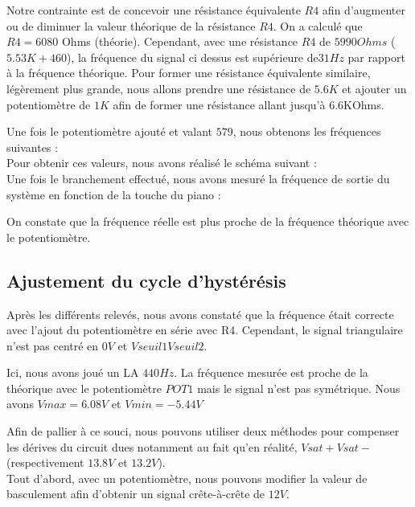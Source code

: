 Notre contrainte est de concevoir une résistance équivalente $R4$ afin d’augmenter ou de diminuer la valeur théorique de la résistance $R4$. 
On a calculé que $R4=6080$ Ohms (théorie).
Cependant, avec une résistance $R4$ de $5990 Ohms$ ($5.53K+460$), la fréquence du signal ci dessus est supérieure de$ 31 Hz$ par rapport à la fréquence théorique.
Pour former une résistance équivalente similaire, légèrement plus grande, nous allons prendre une résistance de $5.6K$ et ajouter un potentiomètre de $1K$ afin de former une résistance allant jusqu’à 6.6KOhms.

Une fois le potentiomètre ajouté et valant $579$, nous obtenons les fréquences suivantes :\\

Pour obtenir ces valeurs, nous avons réalisé le schéma suivant :\\

Une fois le branchement effectué, nous avons mesuré la fréquence de sortie du système en fonction de la touche du piano :

On constate que la fréquence réelle est plus proche de la fréquence théorique avec le potentiomètre.













\subsection{Ajustement du cycle d’hystérésis}
Après les différents relevés, nous avons constaté que la fréquence était correcte avec l’ajout du potentiomètre en série avec R4. 
Cependant, le signal triangulaire n’est pas centré en $0V$ 
et $Vseuil1Vseuil2$.


Ici, nous avons joué un LA $440 Hz$. La fréquence mesurée est proche de la théorique avec le potentiomètre $POT1$ mais le signal n’est pas symétrique. 
Nous avons $Vmax=6.08V$ et $Vmin=-5.44V$





Afin de pallier à ce souci, nous pouvons utiliser deux méthodes pour compenser les dérives du circuit dues notamment au fait qu’en réalité, $Vsat+Vsat-$ 
(respectivement $13.8V$ et $13.2V$). \\
Tout d’abord, avec un potentiomètre, nous pouvons modifier la valeur de basculement afin d’obtenir un signal crête-à-crête de $12V$. \\

